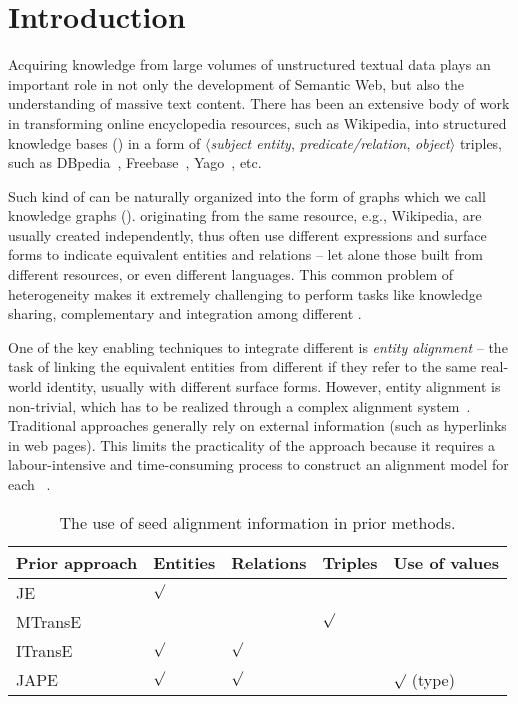 	
	\section{Introduction}
	\label{section:intro}
    Acquiring knowledge from large volumes of unstructured textual data plays an important role in not only the development of Semantic
    Web, but also the understanding of massive text content. There has been an extensive body of work in transforming online encyclopedia resources, such as
    Wikipedia, into structured knowledge bases (\KBs) in a form of $\langle$\emph{subject entity},
   \emph{ predicate/relation}, \emph{object}$\rangle$ triples, such as DBpedia~\cite{Lehmann2009DBpedia,Auer2007DBpedia},
    Freebase~\cite{Bollacker2007Freebase}, Yago~\cite{Suchanek2008YAGO}, etc.
    	


	Such kind of \KBs can be naturally organized into the form of graphs which we call knowledge graphs (\KGs). \KGs originating from the
same resource, e.g., Wikipedia, are usually created independently, thus often use different expressions and surface forms to indicate
equivalent entities and relations -- let alone those built from different resources, or even different languages. This common problem of
heterogeneity makes it extremely challenging to perform tasks like knowledge sharing, complementary and integration among different \KGs.
	
	One of the key enabling techniques to integrate different \KGs is \emph{entity alignment} -- the task of linking the equivalent
entities from different \KGs if they refer to the same real-world identity, usually with different surface forms. However, entity alignment
is non-trivial, which has to be realized through a complex alignment system~\cite{gokhale2014corleone,scharffe2014ontology}.
Traditional approaches generally rely on external information (such as hyperlinks in web pages). This limits the practicality of the
approach because it requires a labour-intensive and time-consuming process to construct an alignment model for each
\KG~\cite{zhu2017iterative}.


\begin{table}[t!]
	\centering
	\scriptsize
	\begin{tabular}{lllll}
		\toprule
		\bf Prior approach & \bf Entities & \bf Relations & \bf Triples & \bf Use of values \\
		\midrule
		\rowcolor{Gray} JE~\cite{hao2016joint} & ${\surd}$ & & & \\
		MTransE~\cite{chen2016multilingual} & $ $ & $ $ & ${\surd}$ & \\
		\rowcolor{Gray} ITransE~\cite{zhu2017iterative} & ${\surd}$ & ${\surd}$& & \\
		JAPE~\cite{sun2017cross} & ${\surd}$& ${\surd}$& & ${\surd}$ (type)\\
		\bottomrule
	\end{tabular}
	\caption{\small The use of seed alignment information in prior methods.}
	\label{seed}
\end{table}
	
